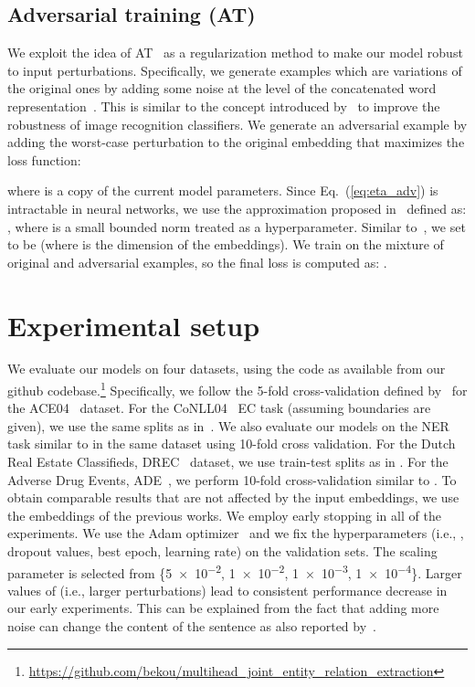 \documentclass[11pt,a4paper]{article}
\newcommand{\ie}{i.e., }
\newcommand{\equref}[1]{Eq.~(\ref{#1})}
\begin{document}
\subsection{Adversarial training (AT)}
\label{sec:adversarial}

We exploit the idea of AT~\cite{goodfellow:15} as a regularization method to make our model robust to input perturbations. Specifically, we generate examples which are variations of the original ones by adding some noise at the level of the concatenated word representation~\cite{miyato:17}. This is similar to the concept introduced by~ to improve the robustness of image recognition classifiers.
We generate an adversarial example by adding the worst-case
perturbation  to the original embedding  that maximizes the loss function:

where  is a copy of the current model parameters. Since \equref{eq:eta_adv} is intractable in neural networks, we use
the approximation proposed in~ defined as:
, where  is a small bounded norm treated as a hyperparameter. 
Similar to~, we set  to be 
(where  is the dimension of the embeddings). 
We train on the mixture of original
and adversarial examples, so the final loss is computed as:
.



\section{Experimental setup}
\label{sec:setup}
\noindent We evaluate our models on four datasets, using the code as available from
our github codebase.\footnote{\url{https://github.com/bekou/multihead_joint_entity_relation_extraction}}
Specifically, we follow the 5-fold cross-validation defined by~ for the ACE04~\citep{doddington:04} dataset. 
For the CoNLL04~\citep{roth:04} EC task (assuming boundaries are given), we use the same splits as in~. We also evaluate our models on the NER task similar to  in the same dataset using 10-fold cross validation. 
For the Dutch Real Estate Classifieds, DREC~\citep{bekoulis:17} dataset, we use train-test splits as in .
For the Adverse Drug Events, ADE~\citep{gurulingappa:12b}, we perform 10-fold cross-validation similar to . To obtain comparable results that are not affected by the input embeddings, we use the embeddings of the previous works. 
We employ early stopping in all of the experiments. We use the Adam optimizer~\citep{kingma:14} and we fix the hyperparameters (\ie , dropout values, best epoch, learning rate) on the validation sets. 
The scaling parameter  is selected from \{\num{5e-2}, \num{1e-2}, \num{1e-3}, \num{1e-4}\}. 
Larger values of  (\ie larger perturbations) lead to consistent performance decrease in our early experiments. This can be explained from the fact that adding more noise can change the content of the sentence as also reported by~.
\end{document}
